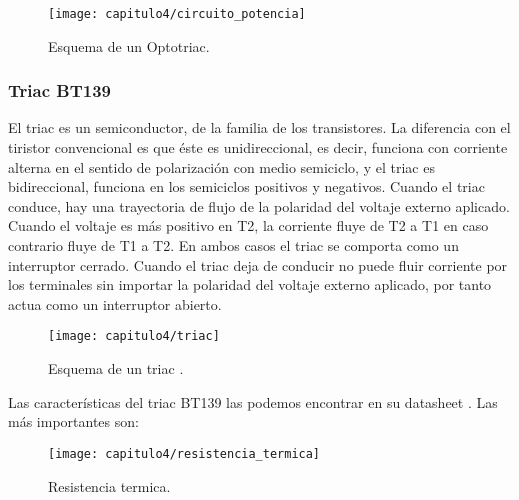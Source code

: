 \smallskip
\begin{figure}[H]%
\noindent \begin{centering}
\texttt{[image: capitulo4/circuito\_potencia]}
\par\end{centering}
\caption{\label{fig:circuito_potencia} Esquema de un Optotriac.}
\end{figure}
\smallskip





\subsubsection{Triac BT139}
El triac es un semiconductor, de la familia de los transistores. La diferencia con el tiristor convencional es que éste es unidireccional, es decir, funciona con corriente alterna en el sentido de polarización con medio semiciclo, y el triac es bidireccional, funciona en los semiciclos positivos y negativos. Cuando el triac conduce, hay una trayectoria de flujo de la polaridad del voltaje externo aplicado. Cuando el voltaje es más positivo en T2, la corriente fluye de T2 a T1 en caso contrario 	fluye de T1 a T2. En ambos casos el triac se comporta como un interruptor cerrado. Cuando el triac deja de conducir no puede fluir corriente por los terminales sin importar la polaridad del voltaje externo aplicado, por tanto actua como un interruptor abierto.

\smallskip
\begin{figure}[H]%
\noindent \begin{centering}
\texttt{[image: capitulo4/triac]}
\par\end{centering}
\caption{\label{fig:triac} Esquema de un triac \cite{BT139}.}
\end{figure}
\smallskip


Las características del triac BT139 las podemos encontrar en su datasheet \cite{BT139}. Las más importantes son:

\smallskip
\begin{figure}[H]%
\noindent \begin{centering}
\texttt{[image: capitulo4/resistencia\_termica]}
\par\end{centering}
\caption{\label{fig:resistencia_termica} Resistencia termica.}
\end{figure}
\smallskip


